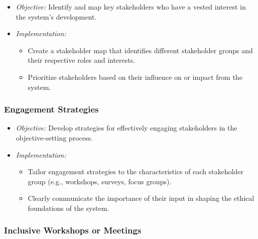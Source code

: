 \documentclass[12pt,a4paper,openright,twoside]{book}
\begin{document}
\begin{itemize}
    
    \item \emph{Objective:} Identify and map key stakeholders who have a vested interest in the system's development.
    
    \item \emph{Implementation:}
    
    \begin{itemize}
    
        \item Create a stakeholder map that identifies different stakeholder groups and their respective roles and interests.
    
        \item Prioritize stakeholders based on their influence on or impact from the system.
    
    \end{itemize}

\end{itemize}

\subsubsection{Engagement Strategies}

\begin{itemize}

    \item \emph{Objective:} Develop strategies for effectively engaging stakeholders in the objective-setting process.

    \item \emph{Implementation:}

    \begin{itemize}

        \item Tailor engagement strategies to the characteristics of each stakeholder group (e.g., workshops, surveys, focus groups).

        \item Clearly communicate the importance of their input in shaping the ethical foundations of the system.

    \end{itemize}

\end{itemize}

\subsubsection{Inclusive Workshops or Meetings}
\end{document}
